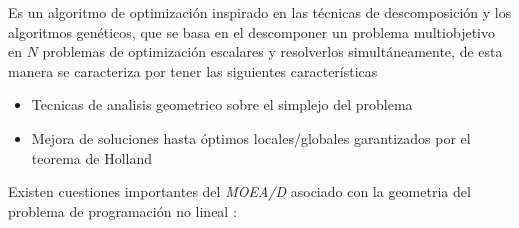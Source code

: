 \documentclass[letterpaper,10pt]{article}
\begin{document}
Es un algoritmo de optimización inspirado en las técnicas de descomposición y los algoritmos genéticos, que se basa en el descomponer un problema multiobjetivo en $N$ problemas de optimización escalares y resolverlos simultáneamente, de esta manera se caracteriza por tener las siguientes características
 \begin{itemize}
 \item Tecnicas de analisis geometrico sobre el simplejo del problema \cite{mie99,Das:1998:NIN:588907.589322, Messac2003}
 \item Mejora de soluciones hasta óptimos locales/globales garantizados por el teorema de Holland\cite{Holland:1992:ANA:531075}
 \end{itemize}
 
Existen cuestiones importantes del \emph{MOEA/D} asociado con la geometria del problema de programación no lineal \cite{4358754}:
\end{document}
